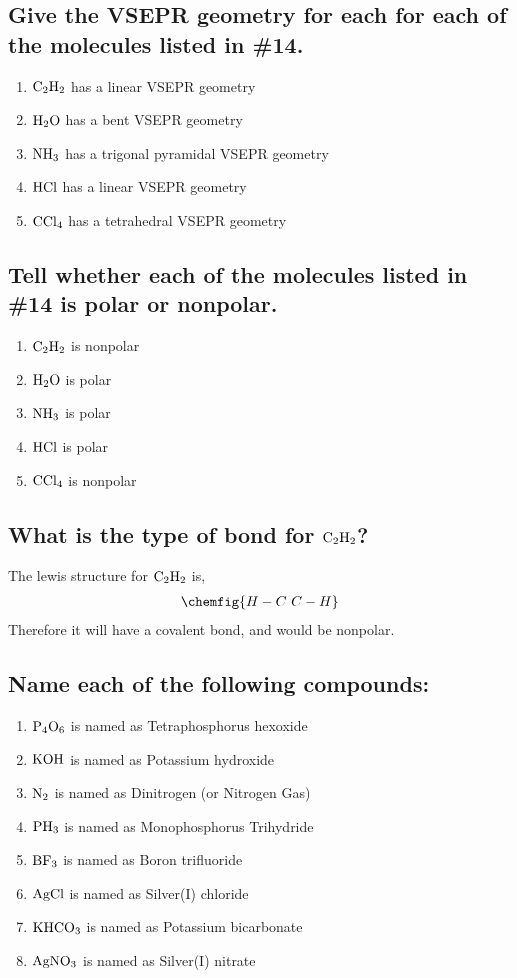 \documentclass[11pt]{article}
\begin{document}
\subsection{Give the VSEPR geometry for each for each of the molecules listed in \#14.}
\label{sec:org77a8cbd}
\begin{enumerate}
\item \(\ce{C2H2}\) has a linear VSEPR geometry
\item \(\ce{H2O}\) has a bent VSEPR geometry
\item \(\ce{NH3}\) has a trigonal pyramidal VSEPR geometry
\item \(\ce{HCl}\) has a linear VSEPR geometry
\item \(\ce{CCl4}\) has a tetrahedral VSEPR geometry
\end{enumerate}

\subsection{Tell whether each of the molecules listed in \#14 is polar or nonpolar.}
\label{sec:orgbaccea2}
\begin{enumerate}
\item \(\ce{C2H2}\) is nonpolar
\item \(\ce{H2O}\) is polar
\item \(\ce{NH3}\) is polar
\item \(\ce{HCl}\) is polar
\item \(\ce{CCl4}\) is nonpolar
\end{enumerate}

\subsection{What is the type of bond for \(\ce{C2H2}\)?}
\label{sec:orgcb47a0d}
The lewis structure for \(\ce{C2H2}\) is,
\begin{align}
\chemfig{{H}-{C}~{C}-{H}}
\end{align}
Therefore it will have a covalent bond, and would be nonpolar.

\subsection{Name each of the following compounds:}
\label{sec:orgc931ac9}
\begin{enumerate}
\item \(\ce{P4O6}\) is named as Tetraphosphorus hexoxide
\item \(\ce{KOH}\) is named as Potassium hydroxide
\item \(\ce{N2}\) is named as Dinitrogen (or Nitrogen Gas)
\item \(\ce{PH3}\) is named as Monophosphorus Trihydride
\item \(\ce{BF3}\) is named as Boron trifluoride
\item \(\ce{AgCl}\) is named as Silver(I) chloride
\item \(\ce{KHCO3}\) is named as Potassium bicarbonate
\item \(\ce{AgNO3}\) is named as Silver(I) nitrate
\end{enumerate}
\end{document}
